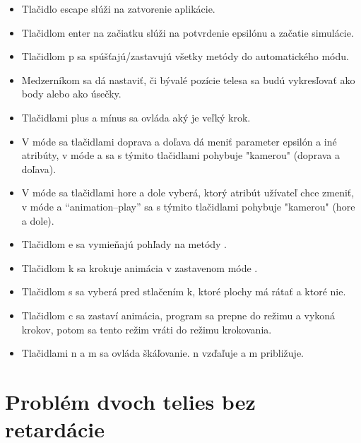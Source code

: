 \begin{itemize}

\item	Tlačidlo escape slúži na zatvorenie aplikácie.
\item	Tlačidlom enter na začiatku slúži na potvrdenie epsilónu a začatie simulácie. 
\item	Tlačidlom p sa spúšťajú/zastavujú všetky metódy do automatického módu.
\item	Medzerníkom sa dá nastaviť, či bývalé pozície telesa sa budú vykresľovať ako body alebo ako úsečky.
\item	Tlačidlami plus a mínus sa ovláda aký je veľký krok. 
\item	V móde  sa tlačidlami doprava a doľava dá meniť parameter epsilón a iné atribúty, v móde   a  sa s týmito tlačidlami pohybuje "kamerou" (doprava a doľava). 
\item	V móde  sa tlačidlami hore a dole vyberá, ktorý atribút užívateľ chce zmeniť, v móde   a “animation–play” sa s týmito tlačidlami pohybuje "kamerou"  (hore a dole).
\item	Tlačidlom e sa vymieňajú pohľady na metódy .
\item	Tlačidlom k sa krokuje animácia v zastavenom móde .
\item	Tlačidlom s sa vyberá pred stlačením k, ktoré plochy má rátať a ktoré nie.
\item	Tlačidlom c sa zastaví animácia, program sa prepne do režimu  a vykoná   krokov, potom sa tento režim vráti do režimu krokovania.
\item	Tlačidlami n a m sa ovláda škáľovanie. n vzďaľuje a m približuje.
\end{itemize}

\section{Problém dvoch telies bez retardácie}
